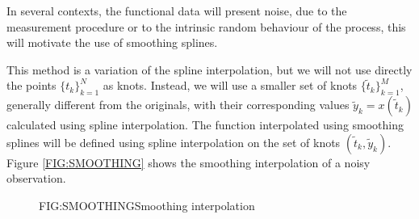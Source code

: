 In several contexts, the functional data will present noise, due to the
measurement procedure or to the intrinsic random behaviour of the process,
this will motivate the use of smoothing splines.

This method is a variation of the spline interpolation, but we will not
use directly the points $\{t_k\}_{k=1}^{N}$ as knots. Instead, we will use a
smaller set of knots $\{\tilde t_k\}_{k=1}^{M}$, generally different from the
originals, with their corresponding values $\tilde y_k = x(\tilde t_k)$
calculated using spline interpolation. The function interpolated using smoothing
splines will be defined using spline interpolation on the set of knots
$(\tilde t_k, \tilde y_k)$. Figure \ref{FIG:SMOOTHING} shows the smoothing
interpolation of a noisy observation.

\begin{figure}[Example of smoothing spline interpolation]{FIG:SMOOTHING}{Smoothing interpolation}
\end{figure}
